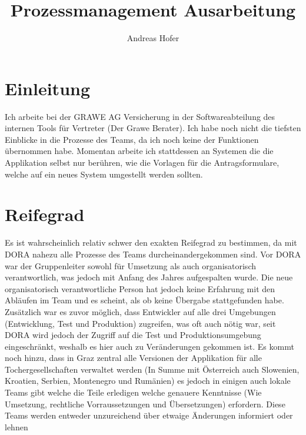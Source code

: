 \documentclass{article}
\title{\vspace{-1cm}Prozessmanagement Ausarbeitung}
\author{Andreas Hofer}
\begin{document}
	\maketitle
	\tableofcontents
	\section{Einleitung}
	Ich arbeite bei der GRAWE AG Versicherung in der Softwareabteilung des internen Tools für Vertreter (Der Grawe Berater). Ich habe noch nicht die tiefsten Einblicke in die Prozesse des Teams, da ich noch keine der Funktionen übernommen habe. Momentan arbeite ich stattdessen an Systemen die die Applikation selbst nur berühren, wie die Vorlagen für die Antragsformulare, welche auf ein neues System umgestellt werden sollten.
	\section{Reifegrad}
	Es ist wahrscheinlich relativ schwer den exakten Reifegrad zu bestimmen, da mit DORA nahezu alle Prozesse des Teams durcheinandergekommen sind. Vor DORA war der Gruppenleiter sowohl für Umsetzung als auch organisatorisch verantwortlich, was jedoch mit Anfang des Jahres aufgespalten wurde. Die neue organisatorisch verantwortliche Person hat jedoch keine Erfahrung mit den Abläufen im Team und es scheint, als ob keine Übergabe stattgefunden habe. Zusätzlich war es zuvor möglich, dass Entwickler auf alle drei Umgebungen (Entwicklung, Test und Produktion) zugreifen, was oft auch nötig war, seit DORA wird jedoch der Zugriff auf die Test und Produktionsumgebung eingeschränkt, weshalb es hier auch zu Veränderungen gekommen ist. Es kommt noch hinzu, dass in Graz zentral alle Versionen der Applikation für alle Tochergesellschaften verwaltet werden (In Summe mit Österreich auch Slowenien, Kroatien, Serbien, Montenegro und Rumänien) es jedoch in einigen auch lokale Teams gibt welche die Teile erledigen welche genauere Kenntnisse (Wie Umsetzung, rechtliche Vorraussetzungen und Übersetzungen) erfordern. Diese Teams werden entweder unzureichend über etwaige Änderungen informiert oder lehnen
	























  
\end{document}
